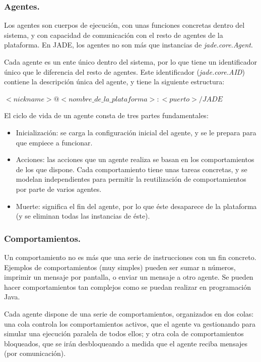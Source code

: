 \subsubsection{Agentes.}

Los agentes son cuerpos de ejecución, con unas funciones concretas dentro del sistema, y con capacidad de comunicación con el resto de agentes de la plataforma. En JADE, los agentes no son más que instancias de \emph{jade.core.Agent}.

Cada agente es un ente único dentro del sistema, por lo que tiene un identificador único que le diferencia del resto de agentes. Este identificador (\emph{jade.core.AID}) contiene la descripción única del agente, y tiene la siguiente estructura:

\begin{center}
	$<nickname>@<nombre\_de\_la\_plataforma>:<puerto>/JADE$
\end{center}

El ciclo de vida de un agente consta de tres partes fundamentales:
\begin{itemize}
\item Inicialización: se carga la configuración inicial del agente, y se le prepara para que empiece a funcionar.
\item Acciones: las acciones que un agente realiza se basan en los comportamientos de los que dispone. Cada comportamiento tiene unas tareas concretas, y se modelan independientes para permitir la reutilización de comportamientos por parte de varios agentes.
\item Muerte: significa el fin del agente, por lo que éste desaparece de la plataforma (y se eliminan todas las instancias de éste).
\end{itemize}

\subsubsection{Comportamientos.}


Un comportamiento no es más que una serie de instrucciones con un fin concreto. Ejemplos de comportamientos (muy simples) pueden ser sumar n números, imprimir un mensaje por pantalla, o enviar un mensaje a otro agente. Se pueden hacer comportamientos tan complejos como se puedan realizar en programación Java.

Cada agente dispone de una serie de comportamientos, organizados en dos colas: una cola controla los comportamientos activos, que el agente va gestionando para simular una ejecución paralela de todos ellos; y otra cola de comportamientos bloqueados, que se irán desbloqueando a medida que el agente reciba mensajes (por comunicación).

